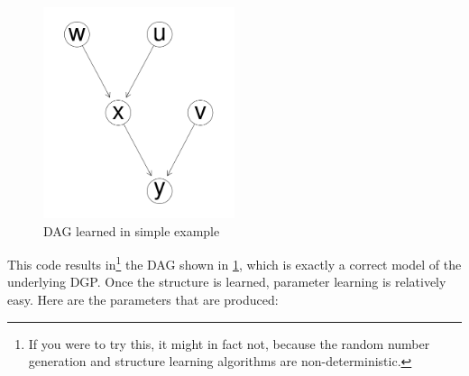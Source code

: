 \documentclass{article}
\begin{document}
\begin{figure}
\centering
\label{dag4}
\includegraphics[width=0.5\textwidth]{images/simple_example.png}
\caption{DAG learned in simple example}
\end{figure}

This code results in\footnote{If you were to try this, it might in fact not, because the random number generation and structure learning algorithms are non-deterministic.} the DAG shown in \ref{dag4}, which is exactly a correct model of the underlying DGP. Once the structure is learned, parameter learning is relatively easy. Here are the parameters that are produced:
\end{document}
